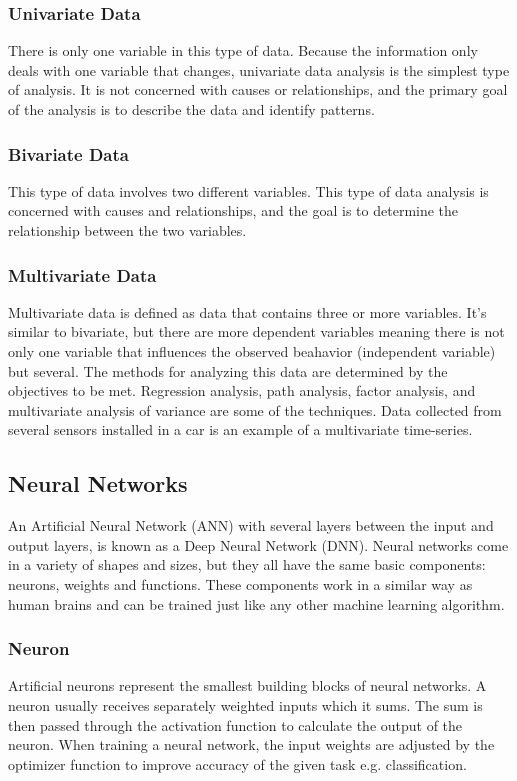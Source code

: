 \subsubsection{Univariate Data}
There is only one variable in this type of data. Because the information only deals with one variable that changes, univariate data analysis is the simplest type of analysis. It is not concerned with causes or relationships, and the primary goal of the analysis is to describe the data and identify patterns.

\subsubsection{Bivariate Data}
This type of data involves two different variables. This type of data analysis is concerned with causes and relationships, and the goal is to determine the relationship between the two variables.

\subsubsection{Multivariate Data}
Multivariate data is defined as data that contains three or more variables. It's similar to bivariate, but there are more dependent variables meaning there is not only one variable that influences the observed beahavior (independent variable) but several. The methods for analyzing this data are determined by the objectives to be met. Regression analysis, path analysis, factor analysis, and multivariate analysis of variance are some of the techniques. Data collected from several sensors installed in a car is an example of a multivariate time-series.

\subsection{Neural Networks}

An Artificial Neural Network (ANN) with several layers between the input and output layers, is known as a Deep Neural Network (DNN). Neural networks come in a variety of shapes and sizes, but they all have the same basic components: neurons, weights and functions. These components work in a similar way as human brains and can be trained just like any other machine learning algorithm.

\subsubsection{Neuron}
Artificial neurons represent the smallest building blocks of neural networks. A neuron usually receives separately weighted inputs which it sums. The sum is then passed through the activation function to calculate the output of the neuron. When training a neural network, the input weights are adjusted by the optimizer function to improve accuracy of the given task e.g. classification.

